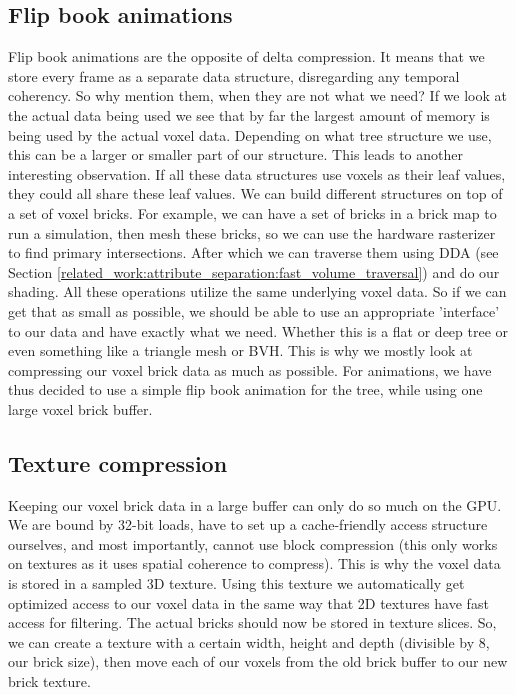 \subsection{Flip book animations} \label{approach:flipbook_animations}
Flip book animations are the opposite of delta compression. It means that we store every frame as a separate data structure, disregarding any temporal coherency. So why mention them, when they are not what we need? If we look at the actual data being used we see that by far the largest amount of memory is being used by the actual voxel data. Depending on what tree structure we use, this can be a larger or smaller part of our structure. This leads to another interesting observation. If all these data structures use voxels as their leaf values, they could all share these leaf values. We can build different structures on top of a set of voxel bricks. For example, we can have a set of bricks in a brick map to run a simulation, then mesh these bricks, so we can use the hardware rasterizer to find primary intersections. After which we can traverse them using DDA (see Section \ref{related_work:attribute_separation:fast_volume_traversal}) and do our shading. All these operations utilize the same underlying voxel data. So if we can get that as small as possible, we should be able to use an appropriate 'interface' to our data and have exactly what we need. Whether this is a flat or deep tree or even something like a triangle mesh or BVH. This is why we mostly look at compressing our voxel brick data as much as possible. For animations, we have thus decided to use a simple flip book animation for the tree, while using one large voxel brick buffer.

\subsection{Texture compression} \label{approach:texture_compression}
Keeping our voxel brick data in a large buffer can only do so much on the GPU. We are bound by 32-bit loads, have to set up a cache-friendly access structure ourselves, and most importantly, cannot use block compression (this only works on textures as it uses spatial coherence to compress). This is why the voxel data is stored in a sampled 3D texture. Using this texture we automatically get optimized access to our voxel data in the same way that 2D textures have fast access for filtering. The actual bricks should now be stored in texture slices. So, we can create a texture with a certain width, height and depth (divisible by 8, our brick size), then move each of our voxels from the old brick buffer to our new brick texture.


